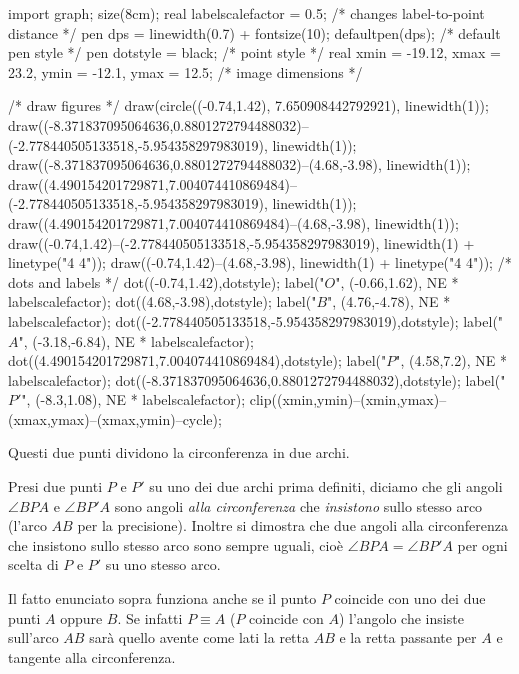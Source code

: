 \documentclass[11pt]{scrartcl}
\begin{document}
	\begin{center}
		\begin{asy}
		import graph; size(8cm); 
		real labelscalefactor = 0.5; /* changes label-to-point distance */
		pen dps = linewidth(0.7) + fontsize(10); defaultpen(dps); /* default pen style */ 
		pen dotstyle = black; /* point style */ 
		real xmin = -19.12, xmax = 23.2, ymin = -12.1, ymax = 12.5;  /* image dimensions */
		
		/* draw figures */
		draw(circle((-0.74,1.42), 7.650908442792921), linewidth(1)); 
		draw((-8.371837095064636,0.8801272794488032)--(-2.778440505133518,-5.954358297983019), linewidth(1)); 
		draw((-8.371837095064636,0.8801272794488032)--(4.68,-3.98), linewidth(1)); 
		draw((4.490154201729871,7.004074410869484)--(-2.778440505133518,-5.954358297983019), linewidth(1)); 
		draw((4.490154201729871,7.004074410869484)--(4.68,-3.98), linewidth(1)); 
		draw((-0.74,1.42)--(-2.778440505133518,-5.954358297983019), linewidth(1) + linetype("4 4")); 
		draw((-0.74,1.42)--(4.68,-3.98), linewidth(1) + linetype("4 4")); 
		/* dots and labels */
		dot((-0.74,1.42),dotstyle); 
		label("$O$", (-0.66,1.62), NE * labelscalefactor); 
		dot((4.68,-3.98),dotstyle); 
		label("$B$", (4.76,-4.78), NE * labelscalefactor); 
		dot((-2.778440505133518,-5.954358297983019),dotstyle); 
		label("$A$", (-3.18,-6.84), NE * labelscalefactor); 
		dot((4.490154201729871,7.004074410869484),dotstyle); 
		label("$P$", (4.58,7.2), NE * labelscalefactor); 
		dot((-8.371837095064636,0.8801272794488032),dotstyle); 
		label("$P'$", (-8.3,1.08), NE * labelscalefactor); 
		clip((xmin,ymin)--(xmin,ymax)--(xmax,ymax)--(xmax,ymin)--cycle); 
		\end{asy}
	\end{center}
	
	Questi due punti dividono la circonferenza in due archi.
	
	\begin{definition}
		Presi due punti $P$ e $P'$ su uno dei due archi prima definiti, diciamo che gli angoli $\angle BPA$ e $\angle BP'A$ sono angoli \textit{alla circonferenza} che \textit{insistono} sullo stesso arco (l'arco $AB$ per la precisione). Inoltre si dimostra che due angoli alla circonferenza che insistono sullo stesso arco sono sempre uguali, cioè $\angle BPA = \angle BP'A$ per ogni scelta di $P$ e $P'$ su uno stesso arco.
	\end{definition}
	
	\begin{remark}
		Il fatto enunciato sopra funziona anche se il punto $P$ coincide con uno dei due punti $A$ oppure $B$. Se infatti $P \equiv A$ ($P$ coincide con $A$) l'angolo che insiste sull'arco $AB$ sarà quello avente come lati la retta $AB$ e la retta passante per $A$ e tangente alla circonferenza.
	\end{remark}
	
\end{document}
